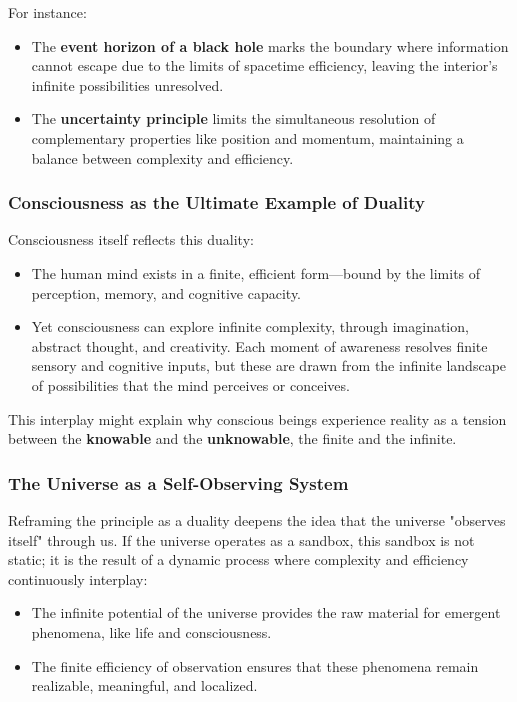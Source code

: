 \documentclass[12pt]{article}
\begin{document}
For instance:
\begin{itemize}
    \item The \textbf{event horizon of a black hole} marks the boundary where information cannot escape due to the limits of spacetime efficiency, leaving the interior's infinite possibilities unresolved.
    \item The \textbf{uncertainty principle} limits the simultaneous resolution of complementary properties like position and momentum, maintaining a balance between complexity and efficiency.
\end{itemize}

\subsubsection{Consciousness as the Ultimate Example of Duality}

Consciousness itself reflects this duality:
\begin{itemize}
    \item The human mind exists in a finite, efficient form—bound by the limits of perception, memory, and cognitive capacity.
    \item Yet consciousness can explore infinite complexity, through imagination, abstract thought, and creativity. Each moment of awareness resolves finite sensory and cognitive inputs, but these are drawn from the infinite landscape of possibilities that the mind perceives or conceives.
\end{itemize}

This interplay might explain why conscious beings experience reality as a tension between the \textbf{knowable} and the \textbf{unknowable}, the finite and the infinite.

\subsubsection{The Universe as a Self-Observing System}

Reframing the principle as a duality deepens the idea that the universe "observes itself" through us. If the universe operates as a sandbox, this sandbox is not static; it is the result of a dynamic process where complexity and efficiency continuously interplay:
\begin{itemize}
    \item The infinite potential of the universe provides the raw material for emergent phenomena, like life and consciousness.
    \item The finite efficiency of observation ensures that these phenomena remain realizable, meaningful, and localized.
\end{itemize}
\end{document}

